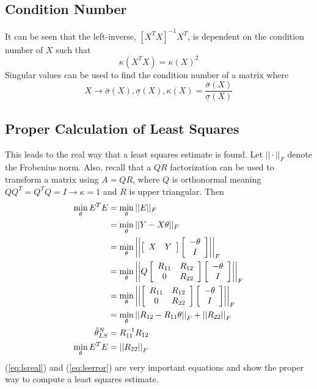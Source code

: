 \subsection{Condition Number}
It can be seen that the left-inverse, $[X^TX]^{-1}X^T$, is dependent on the condition number of $X$ such that
$$\kappa(X^TX) = \kappa(X)^2$$
Singular values can be used to find the condition number of a matrix where
$$X\rightarrow \bar{\sigma}(X), \underline{\sigma}(X), \kappa(X)=\frac{\bar{\sigma}(X)}{\underline{\sigma}(X)}$$

\subsection{Proper Calculation of Least Squares}
This leads to the real way that a least squares estimate is found. Let $||\cdot||_F$ denote the Frobenius norm. Also, recall that a $QR$ factorization can be used to transform a matrix using $A=QR$, where $Q$ is orthonormal meaning $QQ^T=Q^TQ=I\rightarrow\kappa=1$ and $R$ is upper triangular. Then
\begin{align}
\min_\theta E^TE &= \min_\theta||E||_F \nonumber \\
&= \min_\theta||Y-X\theta||_F \nonumber \\
&= \min_\theta\left|\left|\left[\begin{array}{c c} X & Y \end{array}\right] \left[\begin{array}{c} -\theta \\ I \end{array}\right]\right|\right|_F \nonumber \\
&= \min_\theta\left|\left|Q\left[\begin{array}{c c} R_{11} & R_{12} \\ 0 & R_{22} \end{array}\right] \left[\begin{array}{c} -\theta \\ I \end{array}\right]\right|\right|_F \nonumber \\
&= \min_\theta\left|\left|\left[\begin{array}{c c} R_{11} & R_{12} \\ 0 & R_{22} \end{array}\right] \left[\begin{array}{c} -\theta \\ I \end{array}\right]\right|\right|_F \nonumber \\
&= \min_\theta\left|\left|R_{12}-R_{11}\theta\right|\right|_F + \left|\left|R_{22}\right|\right|_F \nonumber \\
\label{eq:lsreal}
\hat{\theta}_{LS}^N &= R_{11}^{-1}R_{12} \\
\label{eq:lserror}
\min_\theta E^TE &= \left|\left|R_{22}\right|\right|_F
\end{align}
(\ref{eq:lsreal}) and (\ref{eq:lserror}) are very important equations and show the proper way to compute a least squares estimate.

